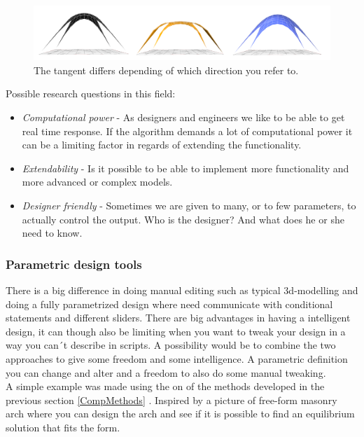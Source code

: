 \begin{figure}[H]
\centering
\includegraphics[width=0.9\linewidth ]{figure/Introduction/PreStudyComp.png}
\caption{The tangent differs depending of which direction you refer to. }
\end{figure}

Possible research questions in this field:
\begin{itemize}
\item \textit{Computational power} - As designers and engineers we like to be able to get real time response. If the algorithm demands a lot of computational power it can be a limiting factor in regards of extending the functionality. 
\item \textit{Extendability} - Is it possible to be able to implement more functionality and more advanced or complex models.
\item \textit{Designer friendly} - Sometimes we are given to many, or to few parameters, to actually control the output. Who is the designer? And what does he or she need to know. 
\end{itemize}

\subsubsection{Parametric design tools}
There is a big difference in doing manual editing such as typical 3d-modelling and doing a fully parametrized design where need communicate with conditional statements and different sliders. There are big advantages in having a intelligent design, it can though also be limiting when you want to tweak your design in a way you can´t describe in scripts. A possibility would be to combine the two approaches to give some freedom and some intelligence. A parametric definition you can change and alter and a freedom to also do some manual tweaking.\\

A simple example was made using the on of the methods developed in the previous section \ref{CompMethods} . Inspired by a picture of free-form masonry arch where you can design the arch and see if it is possible to find an equilibrium solution that fits the form.

